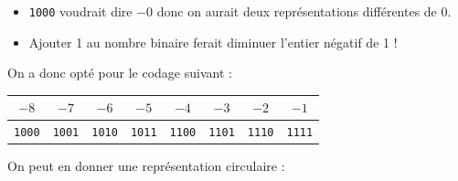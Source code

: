 \begin{itemize}
	\item \texttt{1000} voudrait dire $-0$ donc on aurait deux représentations différentes de 0.
	\item Ajouter 1 au nombre binaire ferait diminuer l'entier négatif de 1 !
\end{itemize}

On a donc opté pour le codage suivant :
\begin{center}
\begin{tabular}{cccccccc}
$-8$ &$-7$ &$-6$ &$-5$ &$-4$ &$-3$ &$-2$ &$-1$ \\ \hline
\texttt{1000} &\texttt{1001} &\texttt{1010} &\texttt{1011} &\texttt{1100} &\texttt{1101} &\texttt{1110} &\texttt{1111}\\
\end{tabular}\end{center}

On peut en donner une représentation circulaire :

